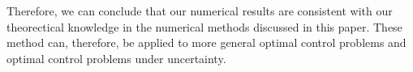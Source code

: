 \documentclass  [
  paper    = a4,
  BCOR     = 10mm,
  twoside,
  fontsize = 12pt,
  fleqn,
  toc      = bibnumbered,
  toc      = listofnumbered,
  numbers  = noendperiod,
  headings = normal,
  listof   = leveldown,
  version  = 3.03
]                                       {scrreprt}
\newcommand{\<}{\langle}
\renewcommand{\>}{\rangle}
\newcommand{\mtrx}[1]{\begin{bmatrix}#1\end{bmatrix}}
\begin{document}
Therefore, we can conclude that our numerical results are consistent with our theorectical knowledge in the numerical methods discussed in this paper. These method can, therefore, be applied to more general optimal control problems and optimal control problems under uncertainty.


 
 
 
 
 
 
 
 
 
 
\end{document}
